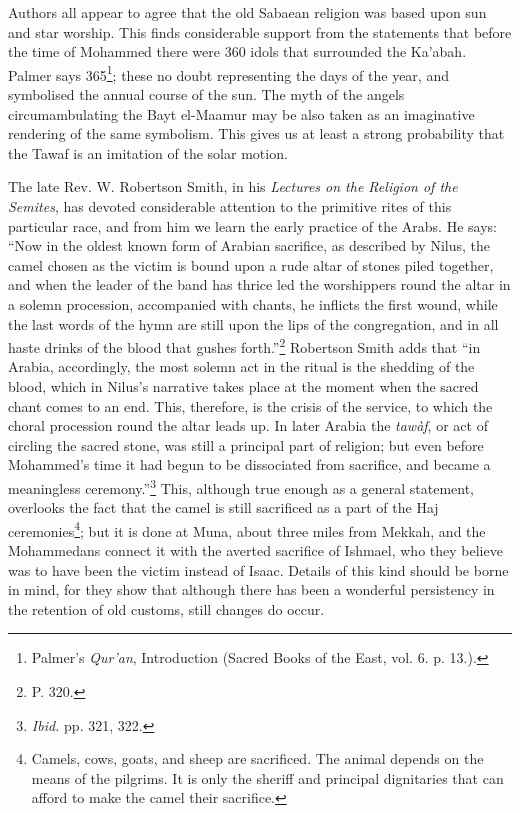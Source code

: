 \documentclass[a4paper, 11pt, oneside, polutonikogreek, english]{article}
\begin{document}
Authors all appear to agree that the old Sabaean religion was based upon sun and star worship. This finds considerable support from the statements that before the time of Mohammed there were 360 idols that surrounded the Ka'abah. Palmer says 365\footnote{Palmer's \emph{Qur'an}, Introduction (Sacred Books of the East, vol. 6. p. 13.).}; these no doubt representing the days of the year, and symbolised the annual course of the sun. The myth of the angels circumambulating the Bayt el-Maamur may be also taken as an imaginative rendering of the same symbolism. This gives us at least a strong probability that the Tawaf is an imitation of the solar motion.

The late Rev. W. Robertson Smith, in his \emph{Lectures on the Religion of the Semites}, has devoted considerable attention to the primitive rites of this particular race, and from him we learn the early practice of the Arabs. He says: ``Now in the oldest known form of Arabian sacrifice, as described by Nilus, the camel chosen as the victim is bound upon a rude altar of stones piled together, and when the leader of the band has thrice led the worshippers round the altar in a solemn procession, accompanied with chants, he inflicts the first wound, while the last words of the hymn are still upon the lips of the congregation, and in all haste drinks of the blood that gushes forth.''\footnote{P. 320.} Robertson Smith adds that ``in Arabia, accordingly, the most solemn act in the ritual is the shedding of the blood, which in Nilus's narrative takes place at the moment when the sacred chant comes to an end. This, therefore, is the crisis of the service, to which the choral procession round the altar leads up. In later Arabia the \emph{tawàf}, or act of circling the sacred stone, was still a principal part of religion; but even before Mohammed's time it had begun to be dissociated from sacrifice, and became a meaningless ceremony.''\footnote{\emph{Ibid.} pp. 321, 322.} This, although true enough as a general statement, overlooks the fact that the camel is still sacrificed as a part of the Haj ceremonies\footnote{Camels, cows, goats, and sheep are sacrificed. The animal depends on the means of the pilgrims. It is only the sheriff and principal dignitaries that can afford to make the camel their sacrifice.}; but it is done at Muna, about three miles from Mekkah, and the Mohammedans connect it with the averted sacrifice of Ishmael, who they believe was to have been the victim instead of Isaac. Details of this kind should be borne in mind, for they show that although there has been a wonderful persistency in the retention of old customs, still changes do occur.
\end{document}
